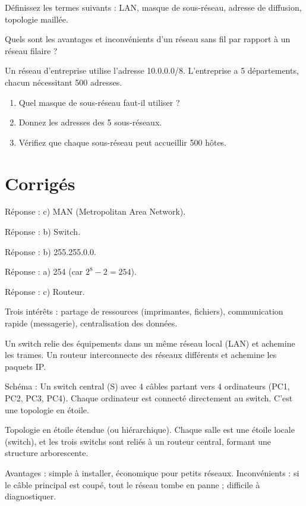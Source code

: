 
\exo{}
Définissez les termes suivants : LAN, masque de sous-réseau, adresse de diffusion, topologie maillée.

\exo{}
Quels sont les avantages et inconvénients d'un réseau sans fil par rapport à un réseau filaire ?

\exo{}
Un réseau d'entreprise utilise l'adresse 10.0.0.0/8. L'entreprise a 5 départements, chacun nécessitant 500 adresses.
\begin{enumerate}
    \item Quel masque de sous-réseau faut-il utiliser ?
    \item Donnez les adresses des 5 sous-réseaux.
    \item Vérifiez que chaque sous-réseau peut accueillir 500 hôtes.
\end{enumerate}

\section{Corrigés}

Réponse : c) MAN (Metropolitan Area Network).

Réponse : b) Switch.

Réponse : b) 255.255.0.0.

Réponse : a) 254 (car $2^8 - 2 = 254$).

Réponse : c) Routeur.

Trois intérêts : partage de ressources (imprimantes, fichiers), communication rapide (messagerie), centralisation des données.

Un switch relie des équipements dans un même réseau local (LAN) et achemine les trames. Un routeur interconnecte des réseaux différents et achemine les paquets IP.

Schéma : Un switch central (S) avec 4 câbles partant vers 4 ordinateurs (PC1, PC2, PC3, PC4). Chaque ordinateur est connecté directement au switch. C'est une topologie en étoile.

Topologie en étoile étendue (ou hiérarchique). Chaque salle est une étoile locale (switch), et les trois switchs sont reliés à un routeur central, formant une structure arborescente.

Avantages : simple à installer, économique pour petits réseaux. Inconvénients : si le câble principal est coupé, tout le réseau tombe en panne ; difficile à diagnostiquer.

